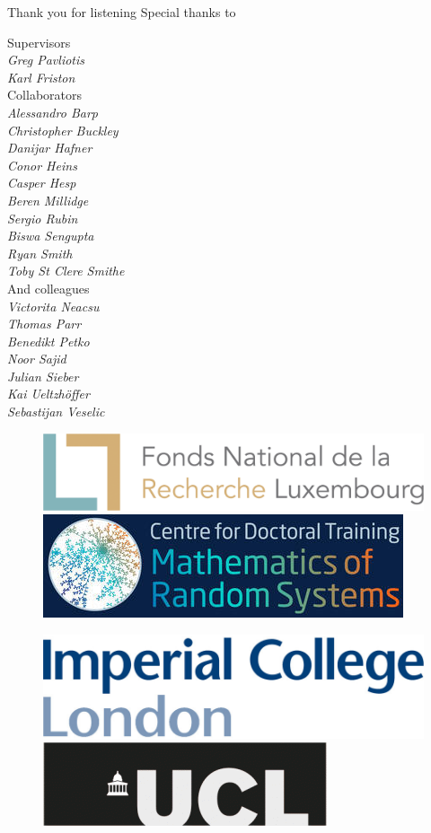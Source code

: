 \documentclass{beamer}
\begin{document}
\begin{frame}{Thank you for listening}
\footnotesize
\vspace{10pt}
Special thanks to
\begin{multicols}{3}

    Supervisors\\
\vspace{10pt}
\textit{Greg Pavliotis\\
Karl Friston\\}
\vspace{10pt}
Collaborators\\
\vspace{10pt}
\textit{Alessandro Barp \\
Christopher Buckley\\
Danijar Hafner \\
Conor Heins \\
Casper Hesp\\
Beren Millidge\\
Sergio Rubin \\
Biswa Sengupta\\
Ryan Smith \\
Toby St Clere Smithe \\}
\vspace{10pt}
And colleagues \\
\vspace{10pt}
\textit{Victorita Neacsu \\
Thomas Parr\\
Benedikt Petko \\
Noor Sajid\\
Julian Sieber \\
Kai Ueltzhöffer \\
Sebastijan Veselic\\}
\end{multicols}
    \begin{figure}[ht]
    \centering
    \includegraphics[width=.45\textwidth]{Figures/fnr_logo.png} \quad
    \includegraphics[width=.45\textwidth]{Figures/cdtrandomsystemslogo.jpg} 
    \end{figure}
    \begin{figure}[ht]
    \centering
    \includegraphics[width=.35\textwidth]{Figures/Imperial_college_logo.png}
    \quad
    \includegraphics[width=.35\textwidth]{Figures/ucl-logo-colours-notext.png} 
    \end{figure}
\end{frame}
\end{document}
